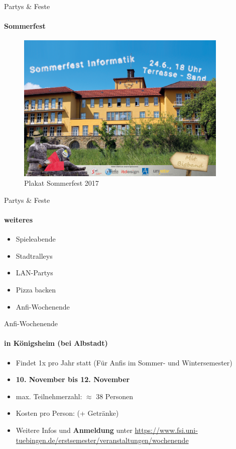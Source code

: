 \documentclass{beamer}
\begin{document}
	\begin{frame}{Partys \& Feste}
		\framesubtitle{Sommerfest}
		\begin{figure}
			\centering
			\includegraphics[width=0.9\textwidth]{pictures/sommerfest.png}
			\caption{Plakat Sommerfest 2017}
		\end{figure}
	\end{frame}
	
	\begin{frame}{Partys \& Feste}
		\framesubtitle{weiteres}
		\begin{itemize}
			\item Spieleabende
			\item Stadtralleys 
			\item LAN-Partys
			\item Pizza backen
			\item Anfi-Wochenende
		\end{itemize}
	\end{frame}
	
	\begin{frame}{Anfi-Wochenende}
		\framesubtitle{in Königsheim (bei Albstadt)}
		\begin{itemize}
		\item Findet 1x pro Jahr statt (Für Anfis im Sommer- und Wintersemester)
		\item \textbf{10. November bis 12. November}
		\item max. Teilnehmerzahl: $\approx$ 38 Personen
		\item Kosten pro Person:  (+ Getränke)
		\item Weitere Infos und \textbf{Anmeldung} unter \url{https://www.fsi.uni-tuebingen.de/erstsemester/veranstaltungen/wochenende}
	\end{itemize}
	\end{frame}
	
\end{document}
